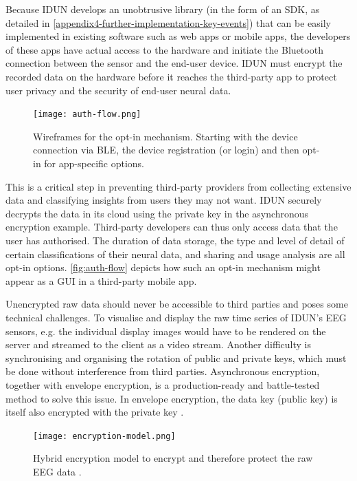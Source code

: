Because IDUN develops an unobtrusive library (in the form of an SDK, as detailed in \autoref{appendix4-further-implementation-key-events}) that can be easily implemented in existing software such as web apps or mobile apps, the developers of these apps have actual access to the hardware and initiate the Bluetooth connection between the sensor and the end-user device. IDUN must encrypt the recorded data on the hardware before it reaches the third-party app to protect user privacy and the security of end-user neural data.

\begin{figure}[!ht]
  \centering
  \texttt{[image: auth-flow.png]}
  \caption{Wireframes for the opt-in mechanism. Starting with the device connection via BLE, the device registration (or login) and then opt-in for app-specific options.}
  \label{fig:auth-flow}
\end{figure}

This is a critical step in preventing third-party providers from collecting extensive data and classifying insights from users they may not want. IDUN securely decrypts the data in its cloud using the private key in the asynchronous encryption example. Third-party developers can thus only access data that the user has authorised. The duration of data storage, the type and level of detail of certain classifications of their neural data, and sharing and usage analysis are all opt-in options. \autoref{fig:auth-flow} depicts how such an opt-in mechanism might appear as a GUI in a third-party mobile app.

Unencrypted raw data should never be accessible to third parties and poses some technical challenges. To visualise and display the raw time series of IDUN's EEG sensors, e.g. the individual display images would have to be rendered on the server and streamed to the client as a video stream. Another difficulty is synchronising and organising the rotation of public and private keys, which must be done without interference from third parties. Asynchronous encryption, together with envelope encryption, is a production-ready and battle-tested method to solve this issue. In envelope encryption, the data key (public key) is itself also encrypted with the private key \citep{google_cloud_envelope_nodate}.

\begin{figure}[!ht]
  \centering
  \texttt{[image: encryption-model.png]}
  \caption[Hybrid encryption model to encrypt and therefore protect the raw EEG data]{Hybrid encryption model to encrypt and therefore protect the raw EEG data \citep{idun_guardian_nodate}.}
  \label{fig:encryption-model}
\end{figure}

